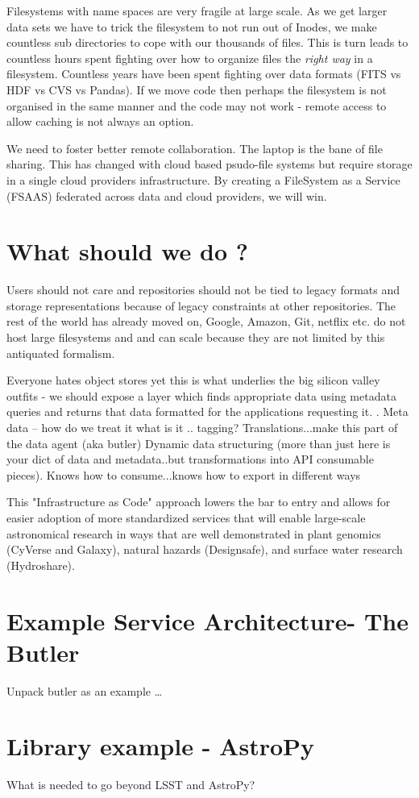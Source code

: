 Filesystems with name spaces are very fragile at large scale. As we get larger data sets we have to trick the filesystem to not run out of Inodes, we make countless sub directories to cope with our thousands of files.
This is turn leads to countless hours spent fighting over how to organize files  the \emph{right way} in a filesystem.
Countless years have been spent fighting over data formats (FITS vs HDF vs CVS vs Pandas).
If we move code then perhaps the filesystem is not organised in the same manner and the code may not work - remote access to allow caching is not always an option.

We need to foster better remote collaboration.  The laptop is the bane of file sharing.
This has changed with cloud based psudo-file systems but require storage in a single
cloud providers infrastructure. By creating a FileSystem as a Service (FSAAS) federated
across data and cloud providers, we will win.


\section{What should  we do ?}
Users should not care and repositories should not be tied to legacy formats  and storage representations because of legacy constraints  at other repositories.
The rest of the world has already moved on,  Google, Amazon, Git, netflix etc. do not host large filesystems and and can scale because they are not limited by this antiquated formalism.

Everyone hates object stores  yet this is what underlies the big silicon valley outfits - we should expose a layer which finds appropriate data using metadata queries and returns that data formatted for the applications requesting it.
.
Meta data -- how do we treat it what is it ..  tagging?  Translations...make this part of the data agent (aka butler)
Dynamic data structuring (more than just here is your dict of data and metadata..but transformations into API consumable pieces).  Knows how to consume...knows how to export in different ways

This "Infrastructure as Code" \citep{morris2016infrastructure} approach lowers the bar to entry
and allows for easier adoption of more standardized services that will enable large-scale
astronomical research in ways that are well demonstrated in plant genomics (CyVerse and Galaxy), natural hazards (Designsafe), and surface water research (Hydroshare).


\section{Example Service Architecture- The Butler}
Unpack butler as an example …

\section{Library example - AstroPy}
What is needed to go beyond LSST and AstroPy?


